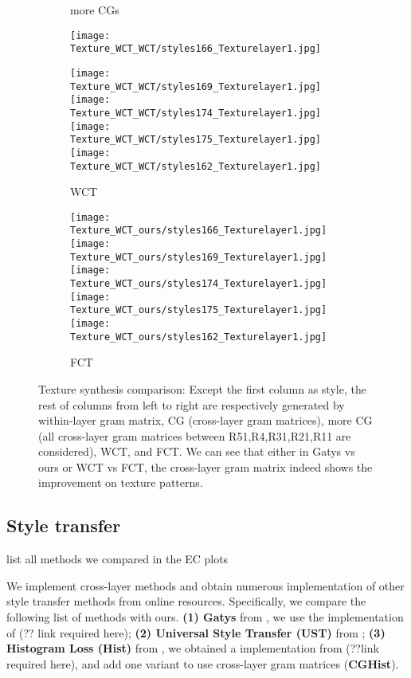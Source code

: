\documentclass[runningheads]{llncs}
\begin{document}
\begin{figure*}[!htbp]
\begin{subfigure}[t]{0.15\textwidth}
    \caption{more CGs}
\end{subfigure}

\begin{subfigure}[t]{0.153\textwidth}
	
	\texttt{[image: Texture\_WCT\_WCT/styles166\_Texturelayer1.jpg]}

	\texttt{[image: Texture\_WCT\_WCT/styles169\_Texturelayer1.jpg]}
	\texttt{[image: Texture\_WCT\_WCT/styles174\_Texturelayer1.jpg]}
	\texttt{[image: Texture\_WCT\_WCT/styles175\_Texturelayer1.jpg]}
    \texttt{[image: Texture\_WCT\_WCT/styles162\_Texturelayer1.jpg]}
    \caption{WCT}
\end{subfigure}
\begin{subfigure}[t]{0.153\textwidth}
	
	\texttt{[image: Texture\_WCT\_ours/styles166\_Texturelayer1.jpg]}
	\texttt{[image: Texture\_WCT\_ours/styles169\_Texturelayer1.jpg]}
	\texttt{[image: Texture\_WCT\_ours/styles174\_Texturelayer1.jpg]}
	\texttt{[image: Texture\_WCT\_ours/styles175\_Texturelayer1.jpg]}
    \texttt{[image: Texture\_WCT\_ours/styles162\_Texturelayer1.jpg]}
    \caption{FCT}
\end{subfigure}
\caption{Texture synthesis comparison: Except the first column as
  style, the rest of columns from left to right are respectively generated by
  within-layer gram matrix, CG (cross-layer gram matrices), more CG (all cross-layer gram matrices between R51,R4,R31,R21,R11 are considered), WCT, and FCT. We can see that
  either in Gatys vs ours or WCT vs FCT, the cross-layer gram
  matrix indeed shows the improvement on texture patterns. }
\label{fig:texture}
\end{figure*}


\subsection{Style transfer}\label{sec:mul}

\todo list all methods we compared in the EC plots

We  implement cross-layer methods and  obtain numerous implementation of other style transfer methods from online resources.  Specifically, we compare the following list of methods with ours. \textbf{(1) Gatys} from \cite{gatys2016image}, we use the implementation of (?? link required here); \textbf{(2) Universal Style Transfer (UST)} from \cite{UST}; \textbf{(3) Histogram Loss (Hist)} from \cite{risser2017stable}, we obtained  a implementation  from (??link required here), and add one variant to use cross-layer gram matrices (\textbf{CGHist}). 
\end{document}
